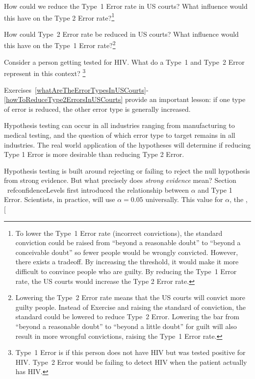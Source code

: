 \begin{exercise} \label{howToReduceType1ErrorsInUSCourts}
How could we reduce the Type~1 Error rate in US courts? What influence would this have on the Type 2 Error rate?\footnote{To lower the Type~1 Error rate (incorrect convictions), the standard conviction could be raised from ``beyond a reasonable doubt'' to ``beyond a conceivable doubt'' so fewer people would be wrongly convicted. However, there exists a tradeoff. By increasing the threshold, it would make it more difficult to convince people who are guilty. By reducing the Type~1 Error rate, the US courts would increase the Type 2 Error rate.}
\end{exercise}

\begin{exercise} \label{howToReduceType2ErrorsInUSCourts}
How could Type~2 Error rate be reduced in US courts? What influence would this have on the Type~1 Error rate?\footnote{Lowering the Type~2 Error rate means that the US courts will convict more guilty people. Instead of Exercise \label{howToReduceType1ErrorsInUSCourts} and raising the standard of conviction, the standard could be lowered to reduce Type~2 Error. Lowering the bar from ``beyond a reasonable doubt'' to ``beyond a little doubt'' for guilt will also result in more wrongful convictions, raising the Type~1 Error rate.}
\end{exercise}

\begin{exercise} \label{errorsinHIVTesting}
Consider a person getting tested for HIV. What do a Type~1 and Type~2 Error represent in this context? \footnote{Type~1 Error is if this person does not have HIV but was tested positive for HIV. Type~2 Error would be failing to detect HIV when the patient actually has HIV. }
\end{exercise}


Exercises~\ref{whatAreTheErrorTypesInUSCourts}-\ref{howToReduceType2ErrorsInUSCourts} provide an important lesson: if one type of error is reduced, the other error type is generally increased. 

Hypothesis testing can occur in all industries ranging from manufacturing to medical testing, and the question of which error type to target remains in all industries. The real world application of the hypotheses will determine if reducing Type 1 Error is more desirable than reducing Type 2 Error. 


Hypothesis testing is built around rejecting or failing to reject the null hypothesis from strong evidence. But what precisely does \emph{strong evidence} mean? Section ~ref{confidenceLevels} first introduced the relationship between $\alpha$ and Type 1 Error. Scientists, in practice, will use $\alpha = 0.05$ universally. This value for $\alpha$, the ,   \marginpar[\raggedright\vspace{-4mm}

